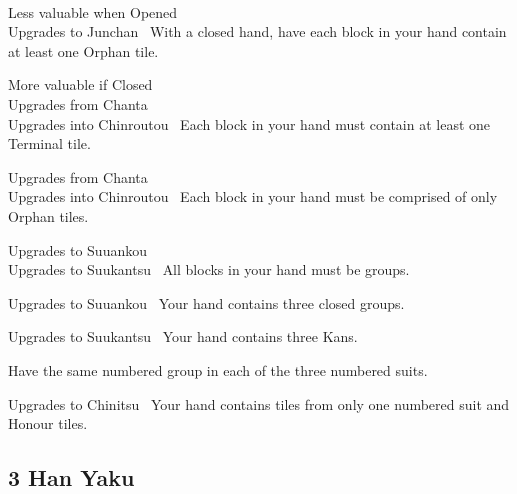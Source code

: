 	{\closedhand \\ 
	\lessvaluable Less valuable when Opened~ \\
	\upgradesto Upgrades to Junchan~}
	{With a closed hand, have each block in your hand contain at least one Orphan tile.}

	{\morevaluable More valuable if Closed~ \\ 
	\upgradesfrom Upgrades from Chanta~ \\
	\upgradesto Upgrades into Chinroutou~}
	{Each block in your hand must contain at least one Terminal tile.}

	{\upgradesfrom Upgrades from Chanta~ \\
	\upgradesto Upgrades into Chinroutou~}
	{Each block in your hand must be comprised of only Orphan tiles.}

	{\upgradesto Upgrades to Suuankou~\\
	\upgradesto Upgrades to Suukantsu~}
	{All blocks in your hand must be groups.}

	{\upgradesto Upgrades to Suuankou~}
	{Your hand contains three closed groups.}

	{\upgradesto Upgrades to Suukantsu~}
	{Your hand contains three Kans.}

	{}
	{Have the same numbered group in each of the three numbered suits.}

	{\upgradesto Upgrades to Chinitsu~}
	{Your hand contains tiles from only one numbered suit and Honour tiles.}


\subsection{3 Han Yaku}\label{core:ssec:3-han-yaku}

